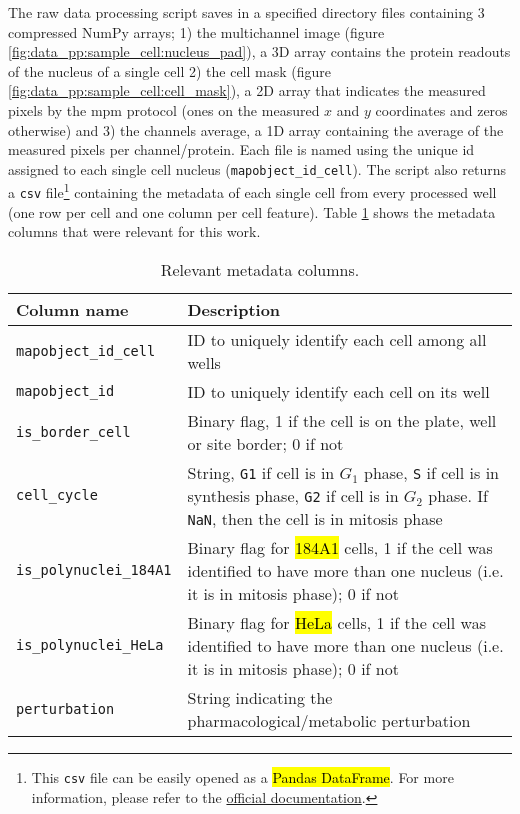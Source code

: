 The raw data processing script saves in a specified directory files containing 3 compressed NumPy arrays; 1) the multichannel image (figure \ref{fig:data_pp:sample_cell:nucleus_pad}), a 3D array contains the protein readouts of the nucleus of a single cell 2) the cell mask (figure \ref{fig:data_pp:sample_cell:cell_mask}), a 2D array that indicates the measured pixels by the \gls{mpm} protocol (ones on the measured $x$ and $y$ coordinates and zeros otherwise) and 3) the channels average, a 1D array containing the average of the measured pixels per channel/protein. Each file is named using the unique id assigned to each single cell nucleus (\texttt{mapobject\_id\_cell}). The script also returns a \texttt{csv} file\footnote{This \texttt{csv} file can be easily opened as a \hl{Pandas DataFrame}. For more information, please refer to the \href{https://pandas.pydata.org/pandas-docs/stable/reference/api/pandas.DataFrame.html}{official documentation}.} containing the metadata of each single cell from every processed well (one row per cell and one column per cell feature). Table \ref{table:dataset:metadata} shows the metadata columns that were relevant for this work.

\setlength{\mylinewidth}{\linewidth-7pt}%
\setlength{\mylengtha}{0.3\mylinewidth-2\arraycolsep}%
\setlength{\mylengthb}{0.7\mylinewidth-2\arraycolsep}%

\begin{table}[!ht]
  \centering
  \begin{tabular}{>{\centering\arraybackslash}m{\mylengtha}|m{\mylengthb}} %
    \hline
    Column name & Description \\
    \hline
    \texttt{mapobject\_id\_cell} & ID to uniquely identify each cell among all wells \\
    \hline
    \texttt{mapobject\_id} & ID to uniquely identify each cell on its well \\
    \hline
    \texttt{is\_border\_cell} & Binary flag, 1 if the cell is on the plate, well or site border; 0 if not \\
    \hline
    \texttt{cell\_cycle} & String, \texttt{G1} if cell is in $G_1$ phase, \texttt{S} if cell is in synthesis phase, \texttt{G2} if cell is in $G_2$ phase. If \texttt{NaN}, then the cell is in mitosis phase \\
    \hline
    \texttt{is\_polynuclei\_184A1} & Binary flag for \hl{184A1} cells, 1 if the cell was identified to have more than one nucleus (i.e. it is in mitosis phase); 0 if not\\
    \hline
    \texttt{is\_polynuclei\_HeLa} & Binary flag for \hl{HeLa} cells, 1 if the cell was identified to have more than one nucleus (i.e. it is in mitosis phase); 0 if not\\
    \hline
    \texttt{perturbation} & String indicating the pharmacological/metabolic perturbation \\
    \hline
  \end{tabular}
  \caption{Relevant metadata columns.}
  \label{table:dataset:metadata}
\end{table}

